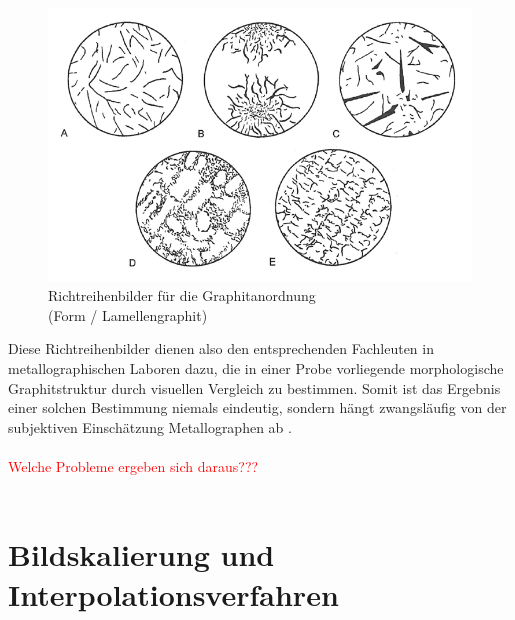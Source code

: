 \documentclass[
fontsize=10pt, 
listof = totoc,
parskip = half	
]{report}
\newcommand{\uproman}[1]{\uppercase\expandafter{\romannumeral#1}}
\begin{document}
\begin{figure}[H]
	\centering
	\includegraphics[scale=0.5]{pics/Anordnungsklassen}
	\caption{Richtreihenbilder für die Graphitanordnung\\ (Form \uproman{1} / Lamellengraphit) \cite{ISO945}}
	\label{fig:Anordnungsklassen}
\end{figure}

\noindent Diese Richtreihenbilder dienen also den entsprechenden Fachleuten in metallographischen Laboren dazu, die in einer Probe vorliegende morphologische Graphitstruktur durch visuellen Vergleich zu bestimmen. Somit ist das Ergebnis einer solchen Bestimmung niemals eindeutig, sondern hängt zwangsläufig von der subjektiven Einschätzung Metallographen ab \cite{ISO945}.
\\\\
\textcolor{red}{Welche Probleme ergeben sich daraus???}
\\\\

\section{Bildskalierung und Interpolationsverfahren}
\label{subsec:SkalierungUndInterpolation}
\end{document}
